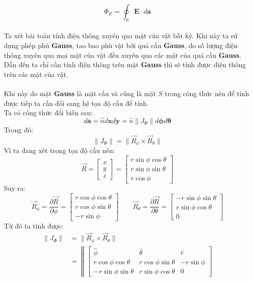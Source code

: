 \begin{enumerate}
\[
\Phi_E = \oint_{S} \mathbf{E}\cdot d\mathbf{a}
\]
\\
Ta xét bài toán tính điện thông xuyên qua mặt của vật bất kỳ. Khi này ta sử dụng phép phủ \textbf{Gauss}, tao bao phủ vật bởi quả cầu \textbf{Gauss}, do số lượng điện thông xuyên qua mọi mặt của vật đều xuyên qua các mặt của quả cầu \textbf{Gauss}. Dẫn đến ta chỉ cần tính điện thông trên mặt \textbf{Gauss} thì sẽ tính được điện thông trên các mặt của vật.
\\ \\
Khi này do mặt \textbf{Gauss} là mặt cầu và cũng là mặt $S$ trong công thức nên để tính được tiếp ta cần đổi sang hệ tọa độ cầu để tính.\\
Ta có công thức đổi biến sau:
\[
d\mathbf{a} = \hat{n} d\mathbf{x}d\mathbf{y} = \hat{n} \lVert J_\Phi \rVert d\mathbf{\phi}d\mathbf{\theta}
\]
Trong đó:
\[
\lVert J_\Phi \rVert = \lVert \vec{R}_\phi \times \vec{R}_\theta \rVert
\]
Vì ta đang xét trong tọa độ cầu nên:
\[
\vec{R}
=
\begin{bmatrix}
x\\
y\\
z
\end{bmatrix}
=
\begin{bmatrix}
r\sin\phi\cos\theta\\
r\sin\phi\sin\theta\\
r\cos\phi
\end{bmatrix}
\]
Suy ra:
\[
\vec{R}_{\phi}
=
\frac{\partial \vec{R}}{\partial \phi}
=
\begin{bmatrix}
r\cos\phi\cos\theta\\
r\cos\phi\sin\theta\\
- r\sin\phi
\end{bmatrix}
\qquad
\vec{R}_{\theta}
=
\frac{\partial \vec{R}}{\partial \theta}
=
\begin{bmatrix}
- r\sin\phi\sin\theta\\
r\sin\phi\cos\theta\\
0
\end{bmatrix}
\]
Từ đó ta tính được:
\begin{align*}
\lVert J_\Phi \rVert
&= \lVert \vec{R}_\phi \times \vec{R}_\theta \rVert \\[6pt]
&=
\left\|
\begin{bmatrix}
\hat{\phi} & \hat{\theta} & \hat{r}\\
r\cos\phi\cos\theta & r\cos\phi\sin\theta & -r\sin\phi\\
-r\sin\phi\sin\theta & r\sin\phi\cos\theta & 0
\end{bmatrix}

\end{align*}
\end{enumerate}
